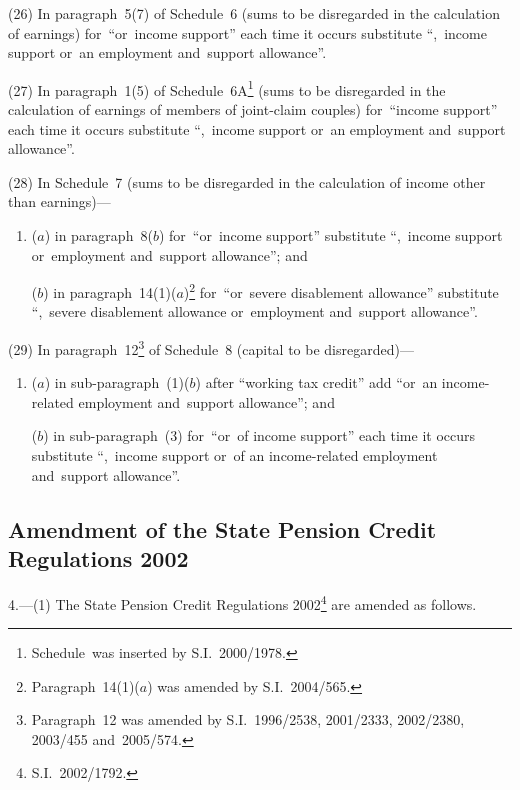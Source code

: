 \documentclass[12pt,a4paper]{article}
\begin{document}
(26) In paragraph~5(7) of Schedule~6 (sums to be disregarded in the calculation of earnings) for~“or~income support” each time it occurs substitute “,~income support or~an employment and~support allowance”.

(27) In paragraph~1(5) of Schedule~6A\footnote{Schedule~was inserted by S.I.~2000/1978.} (sums to be disregarded in the calculation of earnings of members of joint-claim couples) for~“income support” each time it occurs substitute “,~income support or~an employment and~support allowance”.

(28) In Schedule~7 (sums to be disregarded in the calculation of income other than earnings)—
\begin{enumerate}\item[]
($a$) in paragraph~8($b$)  for~“or~income support” substitute “,~income support or~employment and~support allowance”; and

($b$) in paragraph~14(1)($a$)\footnote{Paragraph~14(1)($a$) was amended by S.I.~2004/565.} for~“or~severe disablement allowance” substitute “,~severe disablement allowance or~employment and~support allowance”.
\end{enumerate}

(29) In paragraph~12\footnote{Paragraph~12 was amended by S.I.~1996/2538, 2001/2333, 2002/2380, 2003/455 and~2005/574.} of Schedule~8 (capital to be disregarded)—
\begin{enumerate}\item[]
($a$) in sub-paragraph~(1)($b$)  after “working tax credit” add “or~an income-related employment and~support allowance”; and

($b$) in sub-paragraph~(3) for~“or~of income support” each time it occurs substitute “,~income support or~of an income-related employment and~support allowance”.
\end{enumerate}

\subsection[4. Amendment of the State Pension Credit Regulations 2002]{Amendment of the State Pension Credit Regulations 2002}

4.---(1)  The State Pension Credit Regulations 2002\footnote{S.I.~2002/1792.} are amended as follows.
\end{document}

